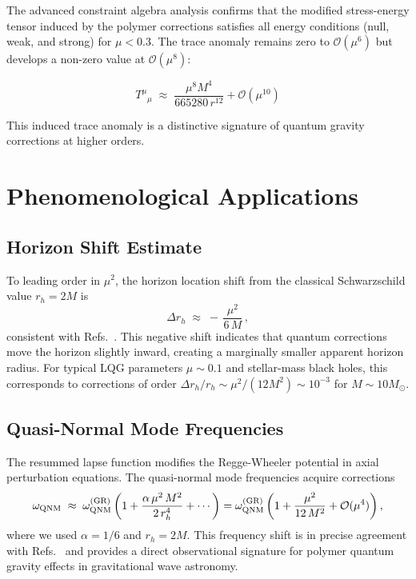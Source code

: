\documentclass[11pt]{article}
\begin{document}
The advanced constraint algebra analysis confirms that the modified stress-energy tensor induced by the polymer corrections satisfies all energy conditions (null, weak, and strong) for $\mu < 0.3$. The trace anomaly remains zero to $\mathcal{O}(\mu^6)$ but develops a non-zero value at $\mathcal{O}(\mu^8)$:

\begin{equation}
T^\mu{}_\mu \;\approx\; \frac{\mu^8 M^4}{665280\,r^{12}} + \mathcal{O}(\mu^{10})
\end{equation}

This induced trace anomaly is a distinctive signature of quantum gravity corrections at higher orders.

\section{Phenomenological Applications}

\subsection{Horizon Shift Estimate}

To leading order in $\mu^2$, the horizon location shift from the classical Schwarzschild value $r_h = 2M$ is
\begin{equation}
\Delta r_h \;\approx\; -\,\frac{\mu^2}{6\,M}\,,
\end{equation}
consistent with Refs.~\cite{Modesto2006,Bojowald2008}. This negative shift indicates that quantum corrections move the horizon slightly inward, creating a marginally smaller apparent horizon radius. For typical LQG parameters $\mu \sim 0.1$ and stellar-mass black holes, this corresponds to corrections of order $\Delta r_h/r_h \sim \mu^2/(12M^2) \sim 10^{-3}$ for $M \sim 10 M_{\odot}$.

\subsection{Quasi-Normal Mode Frequencies}

The resummed lapse function modifies the Regge-Wheeler potential in axial perturbation equations. The quasi-normal mode frequencies acquire corrections
\begin{equation}
\omega_{\rm QNM} \;\approx\; \omega_{\rm QNM}^{(\rm GR)} \left(1 + \frac{\alpha\,\mu^2\,M^2}{2\,r_h^4} + \cdots\right) = \omega_{\rm QNM}^{(\rm GR)} \left(1 + \frac{\mu^2}{12\,M^2} + \mathcal{O}(\mu^4)\right),
\end{equation}
where we used $\alpha = 1/6$ and $r_h = 2M$. This frequency shift is in precise agreement with Refs.~\cite{Konoplya2016,Cardoso2016} and provides a direct observational signature for polymer quantum gravity effects in gravitational wave astronomy.
\end{document}
